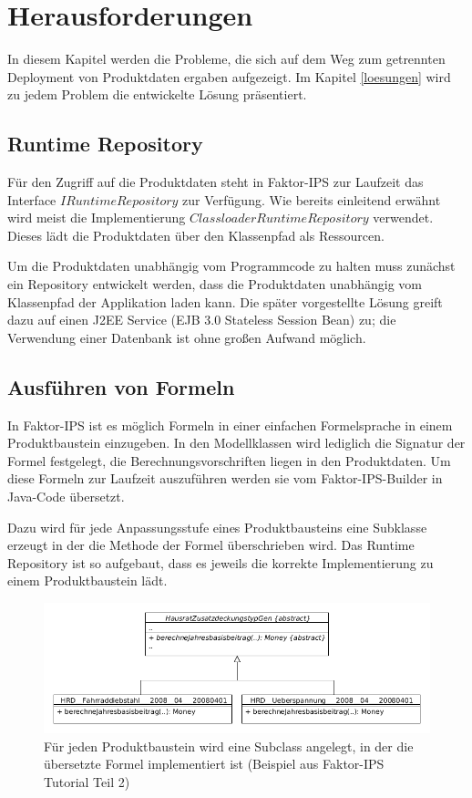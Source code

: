 \documentclass[headsepline=true, footsepline=true]{scrartcl}
\begin{document}
\section{Herausforderungen}

In diesem Kapitel werden die Probleme, die sich auf dem Weg zum getrennten
Deployment von Produktdaten ergaben aufgezeigt. Im Kapitel
\ref{loesungen} wird zu jedem Problem die entwickelte Lösung präsentiert.

\subsection{Runtime Repository}

Für den Zugriff auf die Produktdaten steht in Faktor-IPS zur Laufzeit das
Interface $IRuntimeRepository$ zur Verfügung. Wie bereits einleitend erwähnt
wird meist die Implementierung $ClassloaderRuntimeRepository$ verwendet.
Dieses lädt die Produktdaten über den Klassenpfad als Ressourcen.

Um die Produktdaten unabhängig vom Programmcode zu halten muss zunächst ein
Repository entwickelt werden, dass die Produktdaten unabhängig vom Klassenpfad
der Applikation laden kann. Die später vorgestellte Lösung greift dazu
auf einen J2EE Service (EJB 3.0 Stateless Session Bean) zu; die Verwendung
einer Datenbank ist ohne großen Aufwand möglich.

\subsection{Ausführen von Formeln}

In Faktor-IPS ist es möglich Formeln in einer einfachen Formelsprache in einem
Produktbaustein einzugeben. In den Modellklassen wird lediglich die Signatur der
Formel festgelegt, die Berechnungsvorschriften liegen in den Produktdaten. Um
diese Formeln zur Laufzeit auszuführen werden sie vom Faktor-IPS-Builder in
Java-Code übersetzt.

Dazu wird für jede Anpassungsstufe eines Produktbausteins eine Subklasse
erzeugt in der die Methode der Formel überschrieben wird. Das Runtime Repository
ist so aufgebaut, dass es jeweils die korrekte Implementierung zu einem
Produktbaustein lädt.

\begin{figure}[htb] \centering
\includegraphics[width=13cm]{./pics/subclassing.png} \caption{Für jeden
Produktbaustein wird eine Subclass angelegt, in der die übersetzte Formel
implementiert ist (Beispiel aus Faktor-IPS Tutorial Teil
2)}
\label{subclassing}
\end{figure}
\end{document}
